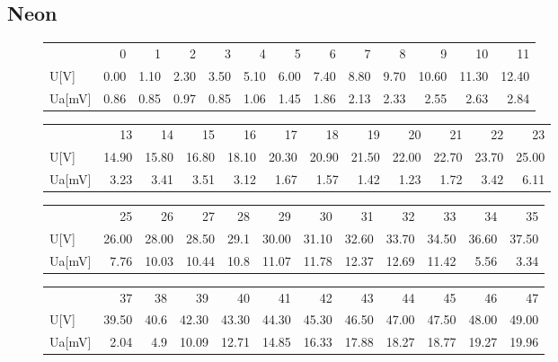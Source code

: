 \documentclass[a4paper,10pt]{article}
\begin{document}
\subsection{Neon}
\begin{figure}[H]
\begin{tabular}{lrrrrrrrrrrrr}
{} &    0  &    1  &    2  &    3  &    4  &    5  &    6  &    7  &    8  &     9  &     10 &     11 \\
U[V]  &  0.00 &  1.10 &  2.30 &  3.50 &  5.10 &  6.00 &  7.40 &  8.80 &  9.70 &  10.60 &  11.30 &  12.40 \\
Ua[mV] &  0.86 &  0.85 &  0.97 &  0.85 &  1.06 &  1.45 &  1.86 &  2.13 &  2.33 &   2.55 &   2.63 &   2.84 \\
\end{tabular}
\end{figure}
\begin{figure}[H]
\begin{tabular}{lrrrrrrrrrrr}
{} &     13 &     14 &     15 &     16 &     17 &     18 &     19 &     20 &     21 &     22 &     23 \\
U[V]  &  14.90 &  15.80 &  16.80 &  18.10 &  20.30 &  20.90 &  21.50 &  22.00 &  22.70 &  23.70 &  25.00 \\
Ua[mV] &   3.23 &   3.41 &   3.51 &   3.12 &   1.67 &   1.57 &   1.42 &   1.23 &   1.72 &   3.42 &   6.11 \\
\end{tabular}
\end{figure}

\begin{figure}[H]
\begin{tabular}{lrrrrrrrrrrr}

{} &     25 &     26 &     27 &    28 &     29 &     30 &     31 &     32 &     33 &     34 &     35 \\

U[V]  &  26.00 &  28.00 &  28.50 &  29.1 &  30.00 &  31.10 &  32.60 &  33.70 &  34.50 &  36.60 &  37.50 \\
Ua[mV] &   7.76 &  10.03 &  10.44 &  10.8 &  11.07 &  11.78 &  12.37 &  12.69 &  11.42 &   5.56 &   3.34 \\

\end{tabular}
\end{figure}

\begin{figure}[H]
\begin{tabular}{lrrrrrrrrrrr}

{} &     37 &    38 &     39 &     40 &     41 &     42 &     43 &     44 &     45 &     46 &     47 \\

U[V]  &  39.50 &  40.6 &  42.30 &  43.30 &  44.30 &  45.30 &  46.50 &  47.00 &  47.50 &  48.00 &  49.00 \\
Ua[mV] &   2.04 &   4.9 &  10.09 &  12.71 &  14.85 &  16.33 &  17.88 &  18.27 &  18.77 &  19.27 &  19.96 \\

\end{tabular}
\end{figure}
\end{document}
